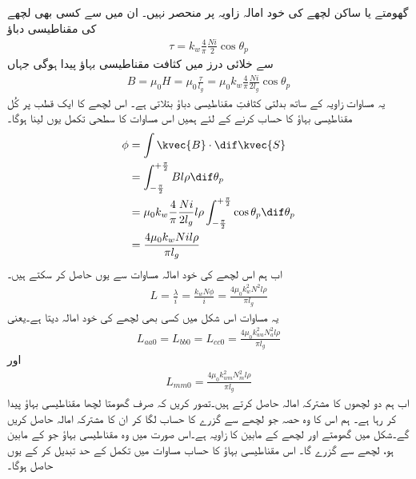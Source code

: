 گھومتے یا ساکن لچھے کی خود امالہ  زاویہ  پر منحصر نہیں۔ ان میں سے کسی بھی لچھے کی مقناطیسی دباؤ  
\begin{align}
\tau=k_w \frac{4}{\pi}\frac{N i}{2} \cos \theta_p
\end{align}
سے خلائی درز میں کثافت مقناطیسی بہاؤ   پیدا ہوگی جہاں	
\begin{align}
B=\mu_0 H=\mu_0 \frac{\tau}{l_g}=\mu_0 k_w \frac{4}{\pi}\frac{N i}{2 l_g} \cos \theta_p
\end{align}
یہ مساوات زاویہ  کے ساتھ بدلتی کثافتِ مقناطیسی دباؤ  بتلاتی ہے۔ اس لچھے کا ایک قطب پر  کُل مقناطیسی بہاؤ  کا حساب کرنے کے لئے ہمیں اس مساوات کا سطحی تکمل یوں لینا ہوگا۔
\begin{gather}
\begin{aligned}
\phi&=\int \kvec{B} \cdot \dif \kvec{S}\\
&=\int_{-\frac{\pi}{2}}^{+\frac{\pi}{2}} B l \rho \dif \theta_p\\
&=\mu_0 k_w \frac{4}{\pi}\frac{N i}{2 l_g} l \rho \int_{-\frac{\pi}{2}}^{+\frac{\pi}{2}}  \cos  \theta_p \dif \theta_p\\
&=\frac{4 \mu_0 k_w N i l \rho}{\pi l_g}
\end{aligned}
\end{gather}
اب ہم اس لچھے کی خود امالہ  مساوات  سے یوں حاصل کر سکتے ہیں۔
\begin{align}
L=\frac{\lambda}{i}=\frac{k_w N \phi}{i}=\frac{4 \mu_0 k_w^2 N^2  l \rho}{\pi l_g}
\end{align}
یہ مساوات اس شکل میں کسی بھی لچھے کی خود امالہ دیتا ہے۔یعنی
\begin{align}
L_{aa0}=L_{bb0}=L_{cc0}=\frac{4 \mu_0 k_{wa}^2 N_a^2  l \rho}{\pi l_g}
\end{align}
اور
\begin{align}
L_{mm0}=\frac{4 \mu_0 k_{wm}^2 N_m^2  l \rho}{\pi l_g}
\end{align}
اب ہم دو لچھوں کا مشترکہ امالہ حاصل کرتے ہیں۔تصور کریں کہ صرف  گھومتا لچھا مقناطیسی بہاؤ پیدا کر رہا ہے۔ ہم اس کا وہ حصہ جو  لچھے  سے گزرے کا حساب لگا کر ان کا مشترکہ امالہ حاصل کریں گے۔شکل   میں گھومتے اور  لچھے کے مابین کا زاویہ  ہے۔اس صورت میں وہ مقناطیسی بہاؤ جو  کے مابین ہو،  لچھے سے گزرے گا۔ اس مقناطیسی بہاؤ کا حساب مساوات  میں تکمل کے حد تبدیل کر کے یوں حاصل ہوگا۔
